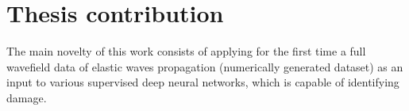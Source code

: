 \section{Thesis contribution}
\label{sec14}
The main novelty of this work consists of applying for the first time a full wavefield data of elastic waves propagation (numerically generated dataset) as an input to various supervised deep neural networks, which is capable of identifying damage.